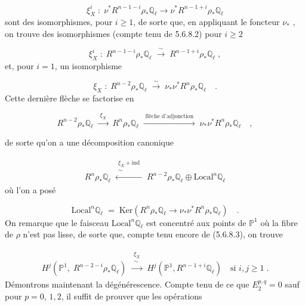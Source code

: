 \begin{equation*}
\xi_X^i \; : \; \nu^* R^{n-1-i}\rho_* \mathbb{Q}_\ell \longrightarrow \nu^* R^{n-1+i}\rho_* \mathbb{Q}_\ell
\end{equation*}
sont des isomorphismes, pour $i \geq 1$, de sorte que, en appliquant le foncteur $\nu_*$ , on trouve des isomorphismes (compte tenu de 5.6.8.2) pour $i \geq 2$

\begin{equation}\tag{5.6.8.3}
\xi_X^i \; : \; R^{n-1-i}\rho_* \mathbb{Q}_\ell \; \xrightarrow{\;\sim\;} \; R^{n-1+i}\rho_* \mathbb{Q}_\ell \; ,
\end{equation}
et, pour $i = 1$, un isomorphisme

\begin{equation}\tag{5.6.8.4}
\xi_X \; : \; R^{n-2}\rho_* \mathbb{Q}_\ell \; \xrightarrow{\;\sim\;} \; \nu_* \nu^* R^n \rho_* \mathbb{Q}_\ell \quad .
\end{equation}
Cette dernière flèche se factorise en

\begin{equation}\tag{5.6.8.5}
R^{n-2}\rho_* \mathbb{Q}_\ell \; \xrightarrow{\;\xi_X\;} \; R^n \rho_* \mathbb{Q}_\ell \; \xrightarrow{\;\text{flèche d'adjonction}\;} \; \nu_* \nu^* R^n \rho_* \mathbb{Q}_\ell \quad , 
\end{equation}


 de sorte qu'on a une décomposition canonique

\begin{multline}\tag{5.6.8.6}
R^n \rho_* \mathbb{Q}_\ell \; \xleftarrow{\substack{\xi_X + \mathrm{ind} \\ \sim}} \; R^{n-2}\rho_* \mathbb{Q}_\ell \oplus \mathrm{Local}^n \mathbb{Q}_\ell
\end{multline}
où l'on a posé

\begin{equation}\tag{5.6.8.7}
\mathrm{Local}^n \mathbb{Q}_\ell \; = \; \mathrm{Ker}(R^n \rho_* \mathbb{Q}_\ell \longrightarrow \nu_* \nu^* R^n \rho_* \mathbb{Q}_\ell) \quad .
\end{equation}
On remarque que le faisceau $\mathrm{Local}^n \mathbb{Q}_\ell$ est concentré aux points de $\mathbb{P}^1$ où la fibre de $\rho$ n'est pas lisse, de sorte que, compte tenu encore de (5.6.8.3), on trouve

\begin{multline}\tag{5.6.8.8}
H^j(\mathbb{P}^1, \; R^{n-2-i}\rho_* \mathbb{Q}_\ell) \; \xrightarrow{\substack{\xi_X \\ \sim}} \; H^j(\mathbb{P}^1,R^{n-1+i}\mathbb{Q}_\ell) \quad \text{si } i,j \geq 1 \; .
\end{multline}
Démontrons maintenant la dégénérescence. Compte tenu de ce que $E_2^{p,q} = 0$ sauf pour $p = 0$, $1,2$, il suffit de prouver que les opérations

